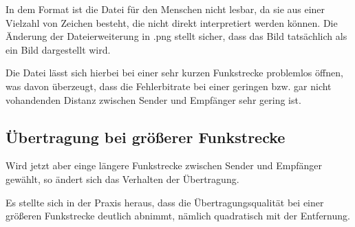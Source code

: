 In dem Format ist die Datei für den Menschen nicht lesbar, da sie aus einer Vielzahl von Zeichen besteht, die nicht direkt interpretiert werden können. 
Die Änderung der Dateierweiterung in .png stellt sicher, dass das Bild tatsächlich als ein Bild dargestellt wird. 

Die Datei lässt sich hierbei bei einer sehr kurzen Funkstrecke problemlos öffnen, was davon überzeugt, dass die Fehlerbitrate bei einer geringen bzw. gar nicht vohandenden Distanz zwischen Sender und Empfänger sehr gering ist.

\subsection{Übertragung bei größerer Funkstrecke}
Wird jetzt aber einge längere Funkstrecke zwischen Sender und Empfänger gewählt, so ändert sich das Verhalten der Übertragung. 

Es stellte sich in der Praxis heraus, dass die Übertragungsqualität bei einer größeren Funkstrecke deutlich abnimmt, nämlich quadratisch mit der Entfernung.

